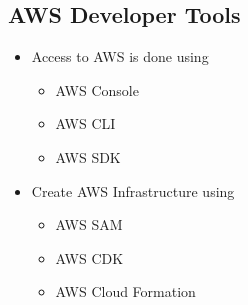 \documentclass[../../main.tex]{subfiles}
\begin{document}
\subsection{AWS Developer Tools}
\begin{itemize}
    \item Access to AWS is done using
    \begin{itemize}
        \item AWS Console
        \item AWS CLI
        \item AWS SDK
    \end{itemize}
    \item Create AWS Infrastructure using
    \begin{itemize}
        \item AWS SAM
        \item AWS CDK
        \item AWS Cloud Formation
    \end{itemize}
\end{itemize}
\end{document}
